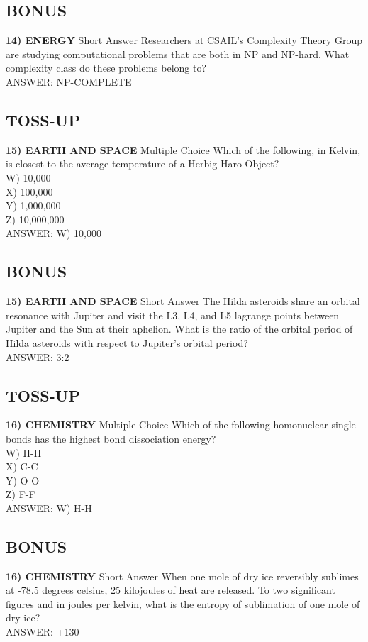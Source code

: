 \documentclass{article}
\begin{document}
\subsection*{BONUS}
\textbf{14) ENERGY} Short Answer Researchers at CSAIL's Complexity Theory Group are studying computational problems that are both in NP and NP-hard. What complexity class do these problems belong to?
\\ANSWER: NP-COMPLETE

\subsection*{TOSS-UP}
\textbf{15) EARTH AND SPACE} Multiple Choice Which of the following, in Kelvin, is closest to the average temperature of a Herbig-Haro Object?
\\W) 10,000
\\X) 100,000
\\Y) 1,000,000
\\Z) 10,000,000
\\ANSWER: W) 10,000

\subsection*{BONUS}
\textbf{15) EARTH AND SPACE} Short Answer The Hilda asteroids share an orbital resonance with Jupiter and visit the L3, L4, and L5 lagrange points between Jupiter and the Sun at their aphelion. What is the ratio of the orbital period of Hilda asteroids with respect to Jupiter's orbital period?
\\ANSWER: 3:2

\subsection*{TOSS-UP}
\textbf{16) CHEMISTRY} Multiple Choice Which of the following homonuclear single bonds has the highest bond dissociation energy?
\\W) H-H
\\X) C-C
\\Y) O-O
\\Z) F-F
\\ANSWER: W) H-H

\subsection*{BONUS}
\textbf{16) CHEMISTRY} Short Answer When one mole of dry ice reversibly sublimes at -78.5 degrees celsius, 25 kilojoules of heat are released. To two significant figures and in joules per kelvin, what is the entropy of sublimation of one mole of dry ice?
\\ANSWER: +130
\end{document}

